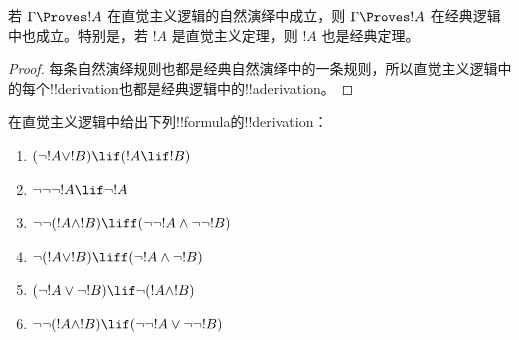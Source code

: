 \documentclass[../../../include/open-logic-section]{subfiles}
\begin{document}
\begin{prop}
  若 $\Gamma \Proves !A$ 在直觉主义逻辑的自然演绎中成立，则 $\Gamma
  \Proves !A$ 在经典逻辑中也成立。特别是，若 $!A$ 是直觉主义定理，则
  $!A$ 也是经典定理。
\end{prop}

\begin{proof}
  每条自然演绎规则也都是经典自然演绎中的一条规则，所以直觉主义逻辑中的每个!!{derivation}也都是经典逻辑中的!!a{derivation}。
\end{proof}

\begin{prob}
  在直觉主义逻辑中给出下列!!{formula}的!!{derivation}：
  \begin{enumerate}
    \item $(\lnot !A \lor !B) \lif (!A \lif !B)$
    \item $\lnot\lnot\lnot !A \lif \lnot !A$
    \item $\lnot\lnot (!A \land !B) \liff (\lnot\lnot !A\land \lnot \lnot !B)$
    \item $\lnot (!A \lor !B) \liff (\lnot !A \land \lnot !B)$
    \item $(\lnot !A \lor \lnot !B) \lif \lnot (!A \land !B)$
    \item $\lnot\lnot ( !A \land !B) \lif  (\lnot\lnot !A \lor
    \lnot\lnot !B)$
  \end{enumerate}
\end{prob}
\end{document}

